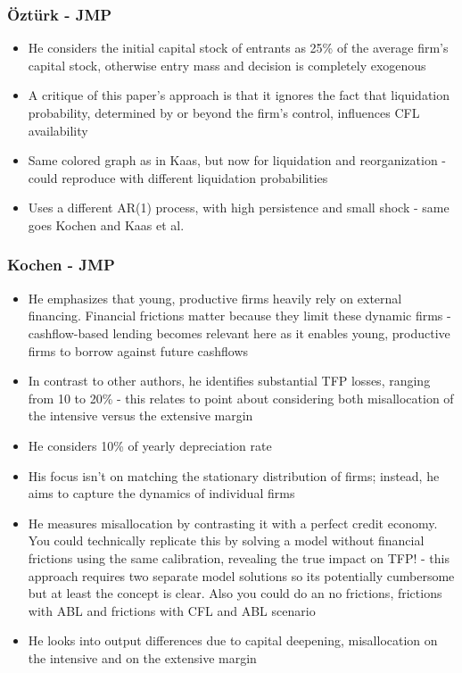 \documentclass[12pt]{article}
\begin{document}
\subsubsection*{Öztürk - JMP}
\begin{itemize}\setlength\itemsep{0em} \small
    \item He considers the initial capital stock of entrants as 25\% of the average firm's capital stock, otherwise entry mass and decision is completely exogenous
    \item A critique of this paper's approach is that it ignores the fact that liquidation probability, determined by or beyond the firm's control, influences CFL availability
    \item Same colored graph as in Kaas, but now for liquidation and reorganization - could reproduce with different liquidation probabilities
    \item Uses a different AR(1) process, with high persistence and small shock - same goes Kochen and Kaas et al.
\end{itemize} \normalsize

\subsubsection*{Kochen - JMP}
\begin{itemize}\setlength\itemsep{0em} \small
    \item He emphasizes that young, productive firms heavily rely on external financing. Financial frictions matter because they limit these dynamic firms - cashflow-based lending becomes relevant here as it enables young, productive firms to borrow against future cashflows
    \item In contrast to other authors, he identifies substantial TFP losses, ranging from 10 to 20\% - this relates to point about considering both misallocation of the intensive versus the extensive margin
    \item He considers 10\% of yearly depreciation rate
    \item His focus isn't on matching the stationary distribution of firms; instead, he aims to capture the dynamics of individual firms
    \item He measures misallocation by contrasting it with a perfect credit economy. You could technically replicate this by solving a model without financial frictions using the same calibration, revealing the true impact on TFP! - this approach requires two separate model solutions so its potentially cumbersome but at least the concept is clear. Also you could do an no frictions, frictions with ABL and frictions with CFL and ABL scenario
    \item He looks into output differences due to capital deepening, misallocation on the intensive and on the extensive margin
\end{itemize} \normalsize
    
\end{document}
